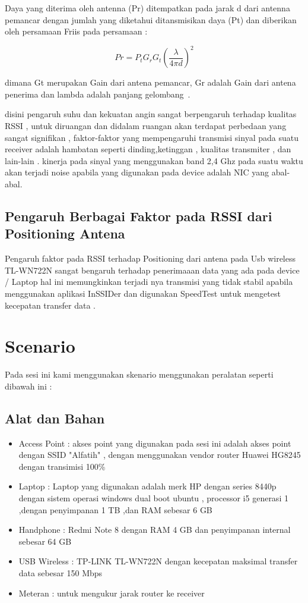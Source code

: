 \documentclass[conference]{IEEEtran}
\begin{document}
Daya yang diterima oleh antenna (Pr) ditempatkan pada jarak d
dari antenna pemancar dengan jumlah yang diketahui
ditansmisikan daya (Pt) dan diberikan oleh
persamaan Friis pada persamaan :

\begin{equation}
    Pr = P_t G_r G_t 
    \left( 
        \frac{\lambda}{4 \pi d}
    \right) ^2
\end{equation}

dimana Gt merupakan Gain dari antena pemancar, Gr
adalah Gain dari antena penerima  dan lambda adalah
panjang gelombang~. \cite{puspitasari2014analisis}

disini pengaruh suhu dan kekuatan angin sangat berpengaruh terhadap kualitas RSSI ,
untuk diruangan dan didalam ruangan akan terdapat perbedaan yang sangat signifikan , faktor-faktor
yang mempengaruhi transmisi sinyal pada suatu receiver adalah hambatan seperti dinding,ketinggan , kualitas transmiter , dan lain-lain .
kinerja pada sinyal yang menggunakan band 2,4 Ghz pada suatu waktu akan terjadi noise apabila yang digunakan pada device adalah NIC yang abal-abal. 

\subsection{Pengaruh Berbagai Faktor pada RSSI dari Positioning Antena}
Pengaruh faktor pada RSSI terhadap Positioning dari antena pada Usb wireless TL-WN722N \cite{LINK2018} sangat bengaruh terhadap penerimaaan data yang ada pada device / Laptop
hal ini memungkinkan terjadi nya transmisi yang tidak stabil apabila menggunakan aplikasi InSSIDer dan digunakan SpeedTest untuk mengetest kecepatan transfer data .

\section{Scenario}
Pada sesi ini kami menggunakan skenario menggunakan peralatan seperti dibawah ini :
\subsection{Alat dan Bahan}

\begin{itemize}
    \item Access Point : akses point yang digunakan pada sesi ini adalah akses point dengan SSID  "Alfatih" , dengan menggunakan vendor router Huawei HG8245 dengan transimisi 100\% 
    \item Laptop : Laptop yang digunakan adalah merk HP dengan series 8440p dengan sistem operasi windows dual boot ubuntu , processor i5 generasi 1 ,dengan penyimpanan 1 TB ,dan RAM sebesar 6 GB 
    \item Handphone : Redmi Note 8 dengan RAM 4 GB dan penyimpanan internal sebesar 64 GB 
    \item USB Wireless : TP-LINK TL-WN722N dengan kecepatan maksimal transfer data sebesar 150 Mbps ~
    \item Meteran : untuk mengukur jarak router ke receiver
\end{itemize}
\end{document}
